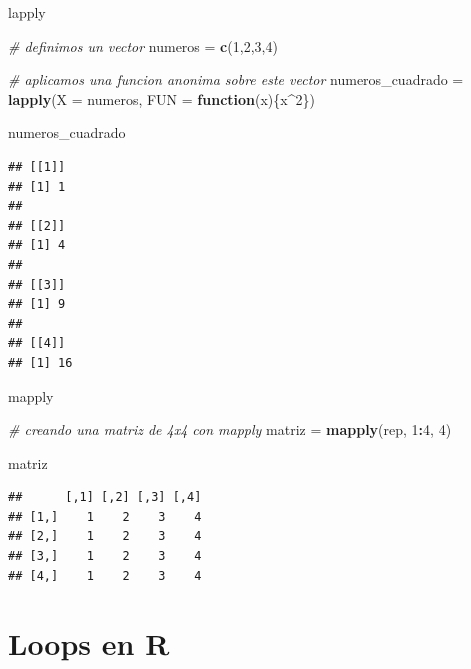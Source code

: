 \documentclass[ignorenonframetext,]{beamer}
\newenvironment{Shaded}{\begin{snugshade}}{\end{snugshade}}
\newcommand{\CommentTok}[1]{\textcolor[rgb]{0.56,0.35,0.01}{\textit{#1}}}
\newcommand{\ControlFlowTok}[1]{\textcolor[rgb]{0.13,0.29,0.53}{\textbf{#1}}}
\newcommand{\DataTypeTok}[1]{\textcolor[rgb]{0.13,0.29,0.53}{#1}}
\newcommand{\DecValTok}[1]{\textcolor[rgb]{0.00,0.00,0.81}{#1}}
\newcommand{\KeywordTok}[1]{\textcolor[rgb]{0.13,0.29,0.53}{\textbf{#1}}}
\newcommand{\NormalTok}[1]{#1}
\newcommand{\OperatorTok}[1]{\textcolor[rgb]{0.81,0.36,0.00}{\textbf{#1}}}
\newcommand{\StringTok}[1]{\textcolor[rgb]{0.31,0.60,0.02}{#1}}
\begin{document}
\begin{frame}[fragile]{lapply}
\protect\hypertarget{lapply}{}

\begin{Shaded}
\begin{Highlighting}[]
\CommentTok{# definimos un vector}
\NormalTok{numeros =}\StringTok{ }\KeywordTok{c}\NormalTok{(}\DecValTok{1}\NormalTok{,}\DecValTok{2}\NormalTok{,}\DecValTok{3}\NormalTok{,}\DecValTok{4}\NormalTok{)}

\CommentTok{# aplicamos una funcion anonima sobre este vector}
\NormalTok{numeros_cuadrado =}\StringTok{ }\KeywordTok{lapply}\NormalTok{(}\DataTypeTok{X =}\NormalTok{ numeros, }\DataTypeTok{FUN =} \ControlFlowTok{function}\NormalTok{(x)\{x}\OperatorTok{^}\DecValTok{2}\NormalTok{\})}

\NormalTok{numeros_cuadrado}
\end{Highlighting}
\end{Shaded}

\begin{verbatim}
## [[1]]
## [1] 1
## 
## [[2]]
## [1] 4
## 
## [[3]]
## [1] 9
## 
## [[4]]
## [1] 16
\end{verbatim}

\end{frame}

\begin{frame}[fragile]{mapply}
\protect\hypertarget{mapply}{}

\begin{Shaded}
\begin{Highlighting}[]
\CommentTok{# creando una matriz de 4x4 con mapply}
\NormalTok{matriz =}\StringTok{ }\KeywordTok{mapply}\NormalTok{(rep, }\DecValTok{1}\OperatorTok{:}\DecValTok{4}\NormalTok{, }\DecValTok{4}\NormalTok{)}

\NormalTok{matriz}
\end{Highlighting}
\end{Shaded}

\begin{verbatim}
##      [,1] [,2] [,3] [,4]
## [1,]    1    2    3    4
## [2,]    1    2    3    4
## [3,]    1    2    3    4
## [4,]    1    2    3    4
\end{verbatim}

\end{frame}

\hypertarget{loops-en-r}{%
\section{Loops en R}\label{loops-en-r}}
\end{document}
